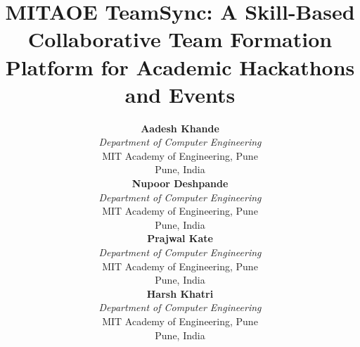\documentclass[conference]{IEEEtran}
\begin{document}
\title{MITAOE TeamSync: A Skill-Based Collaborative Team Formation Platform for Academic Hackathons and Events}

\author{%
\begin{minipage}{\linewidth}\centering
  \begin{minipage}[t]{0.46\linewidth}\centering
    {\large\bfseries Aadesh Khande}\\[3pt]
    \textit{Department of Computer Engineering}\\
    MIT Academy of Engineering, Pune\\
    Pune, India
  \end{minipage}\hfill
  \begin{minipage}[t]{0.46\linewidth}\centering
    {\large\bfseries Nupoor Deshpande}\\[3pt]
    \textit{Department of Computer Engineering}\\
    MIT Academy of Engineering, Pune\\
    Pune, India
  \end{minipage}

  \vspace{1.5em}

  \begin{minipage}[t]{0.46\linewidth}\centering
    {\large\bfseries Prajwal Kate}\\[3pt]
    \textit{Department of Computer Engineering}\\
    MIT Academy of Engineering, Pune\\
    Pune, India
  \end{minipage}\hfill
  \begin{minipage}[t]{0.46\linewidth}\centering
    {\large\bfseries Harsh Khatri}\\[3pt]
    \textit{Department of Computer Engineering}\\
    MIT Academy of Engineering, Pune\\
    Pune, India
  \end{minipage}
\end{minipage}%
}


\maketitle
\end{document}
